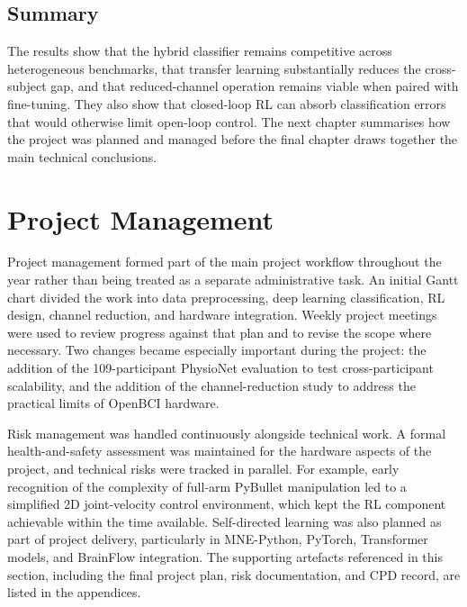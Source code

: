 \documentclass[12pt, a4paper]{article}
\begin{document}
\subsection{Summary}

The results show that the hybrid classifier remains competitive across heterogeneous benchmarks, that transfer learning substantially reduces the cross-subject gap, and that reduced-channel operation remains viable when paired with fine-tuning. They also show that closed-loop RL can absorb classification errors that would otherwise limit open-loop control. The next chapter summarises how the project was planned and managed before the final chapter draws together the main technical conclusions.

\section{Project Management}

Project management formed part of the main project workflow throughout the year rather than being treated as a separate administrative task. An initial Gantt chart divided the work into data preprocessing, deep learning classification, RL design, channel reduction, and hardware integration. Weekly project meetings were used to review progress against that plan and to revise the scope where necessary. Two changes became especially important during the project: the addition of the 109-participant PhysioNet evaluation to test cross-participant scalability, and the addition of the channel-reduction study to address the practical limits of OpenBCI hardware.

Risk management was handled continuously alongside technical work. A formal health-and-safety assessment was maintained for the hardware aspects of the project, and technical risks were tracked in parallel. For example, early recognition of the complexity of full-arm PyBullet manipulation led to a simplified 2D joint-velocity control environment, which kept the RL component achievable within the time available. Self-directed learning was also planned as part of project delivery, particularly in MNE-Python, PyTorch, Transformer models, and BrainFlow integration. The supporting artefacts referenced in this section, including the final project plan, risk documentation, and CPD record, are listed in the appendices.
\end{document}
